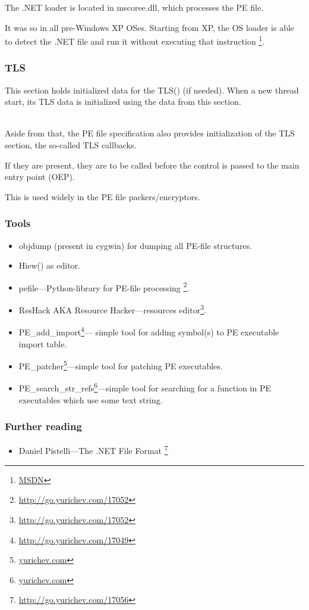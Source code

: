 The .NET loader is located in mscoree.dll, which processes the PE file.

It was so in all pre-Windows XP \ac{OS}es. Starting from XP, the \ac{OS} loader is able to detect the .NET file
and run it without executing that \JMP instruction
\footnote{\href{http://go.yurichev.com/17051}{MSDN}}.

\subsubsection{TLS}

This section holds initialized data for the \ac{TLS}() (if needed).
When a new thread start, its \ac{TLS} data is initialized using the data from this section. \\
\\

Aside from that, the PE file specification also provides initialization of the
\ac{TLS} section, the so-called TLS callbacks.

If they are present, they are to be called before the control is passed to the main entry point (\ac{OEP}).

This is used widely in the PE file packers/encryptors.

\subsubsection{Tools}

\label{ResHack}

\begin{itemize}
\item objdump (present in cygwin) for dumping all PE-file structures.

\item Hiew() as editor.

\item pefile---Python-library for PE-file processing \footnote{\url{http://go.yurichev.com/17052}}.

\item ResHack \acs{AKA} Resource Hacker---resources editor\footnote{\url{http://go.yurichev.com/17052}}.

\item PE\_add\_import\footnote{\url{http://go.yurichev.com/17049}}---
simple tool for adding symbol(s) to PE executable import table.

\item PE\_patcher\footnote{\href{http://go.yurichev.com/17054}{yurichev.com}}---simple tool for patching PE executables.

\item PE\_search\_str\_refs\footnote{\href{http://go.yurichev.com/17055}{yurichev.com}}---simple tool for searching for a function in PE executables which use some text string.
\end{itemize}

\subsubsection{Further reading}

\begin{itemize}
\item Daniel Pistelli---The .NET File Format \footnote{\url{http://go.yurichev.com/17056}}
\end{itemize}

